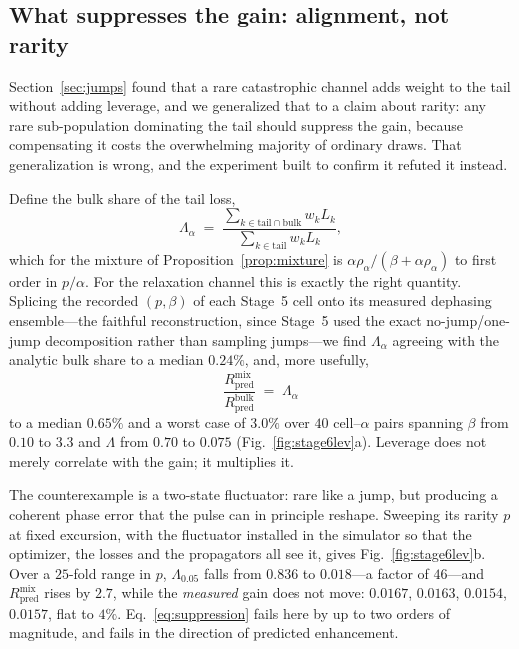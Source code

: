 \documentclass[aps,pra,twocolumn,superscriptaddress,reprint,nofootinbib,floatfix]{revtex4-2}
\theoremstyle{definition}
\begin{document}
\subsection{What suppresses the gain: alignment, not rarity}
\label{sec:alignment}

Section~\ref{sec:jumps} found that a rare catastrophic channel adds weight to
the tail without adding leverage, and we generalized that to a claim about
rarity: any rare sub-population dominating the tail should suppress the gain,
because compensating it costs the overwhelming majority of ordinary draws.
That generalization is wrong, and the experiment built to confirm it refuted
it instead.

Define the bulk share of the tail loss,
\begin{equation}
\Lambda_\alpha \;=\;
\frac{\sum_{k\in\text{tail}\cap\text{bulk}} w_k L_k}
     {\sum_{k\in\text{tail}} w_k L_k},
\label{eq:leverage}
\end{equation}
which for the mixture of Proposition~\ref{prop:mixture} is
$\alpha\rho_\alpha/(\beta+\alpha\rho_\alpha)$ to first order in $p/\alpha$.
For the relaxation channel this is exactly the right quantity. Splicing the
recorded $(p,\beta)$ of each Stage~5 cell onto its measured dephasing
ensemble---the faithful reconstruction, since Stage~5 used the exact
no-jump/one-jump decomposition rather than sampling jumps---we find
$\Lambda_\alpha$ agreeing with the analytic bulk share to a median $0.24\%$,
and, more usefully,
\begin{equation}
\frac{R_{\mathrm{pred}}^{\mathrm{mix}}}{R_{\mathrm{pred}}^{\mathrm{bulk}}}
\;=\; \Lambda_\alpha
\label{eq:suppression}
\end{equation}
to a median $0.65\%$ and a worst case of $3.0\%$ over $40$ cell--$\alpha$
pairs spanning $\beta$ from $0.10$ to $3.3$ and $\Lambda$ from $0.70$ to
$0.075$ (Fig.~\ref{fig:stage6lev}a). Leverage does not merely correlate with
the gain; it multiplies it.

The counterexample is a two-state fluctuator: rare like a jump, but producing
a coherent phase error that the pulse can in principle reshape. Sweeping its
rarity $p$ at fixed excursion, with the fluctuator installed in the simulator
so that the optimizer, the losses and the propagators all see it, gives
Fig.~\ref{fig:stage6lev}b. Over a $25$-fold range in $p$, $\Lambda_{0.05}$
falls from $0.836$ to $0.018$---a factor of $46$---and
$R^{\mathrm{mix}}_{\mathrm{pred}}$ rises by $2.7$, while the \emph{measured}
gain does not move: $0.0167$, $0.0163$, $0.0154$, $0.0157$, flat to $4\%$.
Eq.~\eqref{eq:suppression} fails here by up to two orders of magnitude, and
fails in the direction of predicted enhancement.
\end{document}
